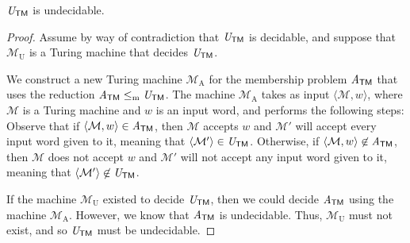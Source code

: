 \begin{theorem}\label{thm:UTMundecidable}
$\mathit{U}_{\textsf{TM}}$ is undecidable.

\begin{proof}
Assume by way of contradiction that $\mathit{U}_{\textsf{TM}}$ is decidable, and suppose that $\mathcal{M}_{\mathrm{U}}$ is a Turing machine that decides $\mathit{U}_{\textsf{TM}}$.

We construct a new Turing machine $\mathcal{M}_{\mathrm{A}}$ for the membership problem $\mathit{A}_{\textsf{TM}}$ that uses the reduction $\mathit{A}_{\textsf{TM}} \leq_{\mathrm{m}} \mathit{U}_{\textsf{TM}}$. The machine $\mathcal{M}_{\mathrm{A}}$ takes as input $\langle \mathcal{M}, w \rangle$, where $\mathcal{M}$ is a Turing machine and $w$ is an input word, and performs the following steps:
Observe that if $\langle \mathcal{M}, w \rangle \in \mathit{A}_{\textsf{TM}}$, then $\mathcal{M}$ accepts $w$ and $\mathcal{M}'$ will accept every input word given to it, meaning that $\langle \mathcal{M}' \rangle \in \mathit{U}_{\textsf{TM}}$. Otherwise, if $\langle \mathcal{M}, w \rangle \not\in \mathit{A}_{\textsf{TM}}$, then $\mathcal{M}$ does not accept $w$ and $\mathcal{M}'$ will not accept any input word given to it, meaning that $\langle \mathcal{M}' \rangle \not\in \mathit{U}_{\textsf{TM}}$.

If the machine $\mathcal{M}_{\mathrm{U}}$ existed to decide $\mathit{U}_{\textsf{TM}}$, then we could decide $\mathit{A}_{\textsf{TM}}$ using the machine $\mathcal{M}_{\mathrm{A}}$. However, we know that $\mathit{A}_{\textsf{TM}}$ is undecidable. Thus, $\mathcal{M}_{\mathrm{U}}$ must not exist, and so $\mathit{U}_{\textsf{TM}}$ must be undecidable.
\end{proof}
\end{theorem}

